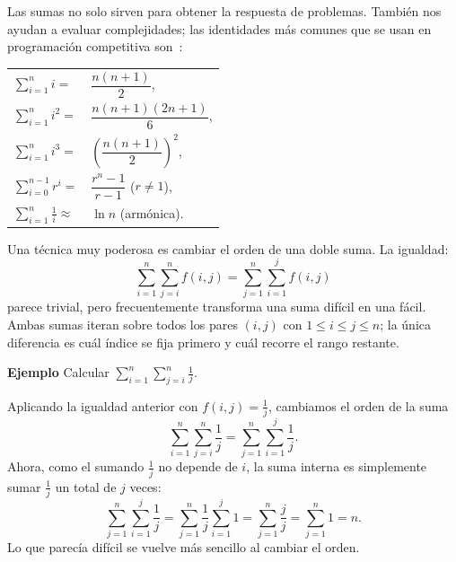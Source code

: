 Las sumas no solo sirven para obtener la respuesta de problemas. También nos ayudan a evaluar complejidades; las identidades más comunes que se usan en programación competitiva son~\cite{perez_algebra}:
\begin{table}[H]
\centering
\renewcommand{\arraystretch}{1.6}
\begin{tabular}{ll}
$\displaystyle\sum_{i=1}^{n} i =$          & $\dfrac{n(n+1)}{2}$, \\
$\displaystyle\sum_{i=1}^{n} i^2 = $        & $\dfrac{n(n+1)(2n+1)}{6}$, \\
$\displaystyle\sum_{i=1}^{n} i^3 = $        & $\left(\dfrac{n(n+1)}{2}\right)^2$, \\
$\displaystyle\sum_{i=0}^{n-1} r^i = $      & $\dfrac{r^n-1}{r-1}$ \quad ($r \neq 1$), \\
$\displaystyle\sum_{i=1}^{n} \frac{1}{i} \approx $ & $ \ln n $ \quad (armónica). \\

\end{tabular}
\end{table}

Una técnica muy poderosa es cambiar el orden de una doble suma. La igualdad:
\[
\sum_{i=1}^{n}\sum_{j=i}^{n} f(i,j) = \sum_{j=1}^{n}\sum_{i=1}^{j} f(i,j)
\]
parece trivial, pero frecuentemente transforma una suma difícil en una fácil. Ambas sumas iteran sobre todos los pares $(i,j)$ con $1 \le i \le j \le n$; la única diferencia es cuál índice se fija primero y cuál recorre el rango restante.

\textbf{Ejemplo} Calcular $\displaystyle\sum_{i=1}^{n}\sum_{j=i}^{n}\frac{1}{j}$. 

Aplicando la igualdad anterior
con $f(i,j) = \frac{1}{j}$, cambiamos el orden de la suma 
\[
\sum_{i=1}^{n}\sum_{j=i}^{n} \frac{1}{j} = \sum_{j=1}^{n}\sum_{i=1}^{j} \frac{1}{j}.
\]
Ahora, como el sumando $\frac{1}{j}$ no depende de $i$, la suma interna es simplemente sumar $\frac{1}{j}$ un total de $j$ veces:
\[
\sum_{j=1}^{n}\sum_{i=1}^{j} \frac{1}{j} = \sum_{j=1}^{n} \frac{1}{j}\sum_{i=1}^{j} 1
= \sum_{j=1}^{n} \frac{j}{j} = \sum_{j=1}^{n} 1 = n.
\]
Lo que parecía difícil se vuelve más sencillo al cambiar el orden.

